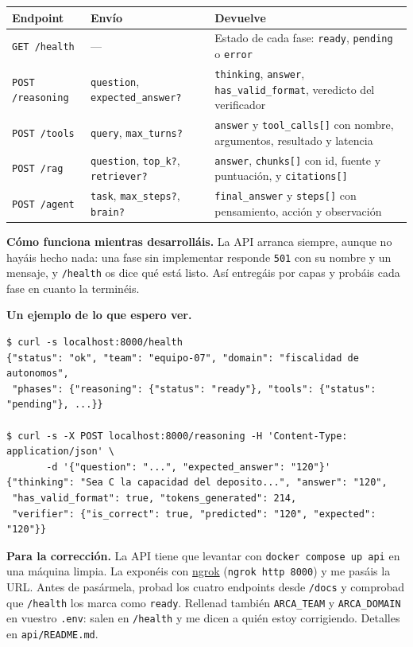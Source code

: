 \documentclass[11pt,a4paper]{article}
\newcommand{\code}[1]{{\small\texttt{#1}}}
\newcommand{\file}[1]{{\small\texttt{\textcolor{arcablue}{#1}}}}
\begin{document}
\begin{center}
\small
\begin{tabularx}{\textwidth}{@{}l l X@{}}
\toprule
\textbf{Endpoint} & \textbf{Envío} & \textbf{Devuelve} \\
\midrule
\code{GET /health} & --- & Estado de cada fase: \code{ready}, \code{pending} o \code{error} \\
\code{POST /reasoning} & \code{question}, \code{expected\_answer?} & \code{thinking},
  \code{answer}, \code{has\_valid\_format}, veredicto del verificador \\
\code{POST /tools} & \code{query}, \code{max\_turns?} & \code{answer} y \code{tool\_calls[]}
  con nombre, argumentos, resultado y latencia \\
\code{POST /rag} & \code{question}, \code{top\_k?}, \code{retriever?} & \code{answer},
  \code{chunks[]} con id, fuente y puntuación, y \code{citations[]} \\
\code{POST /agent} & \code{task}, \code{max\_steps?}, \code{brain?} &
  \code{final\_answer} y \code{steps[]} con pensamiento, acción y observación \\
\bottomrule
\end{tabularx}
\end{center}

\textbf{Cómo funciona mientras desarrolláis.} La API arranca siempre, aunque no hayáis hecho
nada: una fase sin implementar responde \code{501} con su nombre y un mensaje, y
\code{/health} os dice qué está listo. Así entregáis por capas y probáis cada fase en cuanto
la terminéis.

\textbf{Un ejemplo de lo que espero ver.}

{\footnotesize
\begin{verbatim}
$ curl -s localhost:8000/health
{"status": "ok", "team": "equipo-07", "domain": "fiscalidad de autonomos",
 "phases": {"reasoning": {"status": "ready"}, "tools": {"status": "pending"}, ...}}

$ curl -s -X POST localhost:8000/reasoning -H 'Content-Type: application/json' \
       -d '{"question": "...", "expected_answer": "120"}'
{"thinking": "Sea C la capacidad del deposito...", "answer": "120",
 "has_valid_format": true, "tokens_generated": 214,
 "verifier": {"is_correct": true, "predicted": "120", "expected": "120"}}
\end{verbatim}
}
\vspace{-1.6ex}

\begin{nota}
\textbf{Para la corrección.} La API tiene que levantar con \code{docker compose up api} en
una máquina limpia. La exponéis con \href{https://ngrok.com/}{ngrok} (\code{ngrok http 8000})
y me pasáis la URL. Antes de pasármela, probad los cuatro endpoints desde \code{/docs} y
comprobad que \code{/health} los marca como \code{ready}. Rellenad también \code{ARCA\_TEAM}
y \code{ARCA\_DOMAIN} en vuestro \code{.env}: salen en \code{/health} y me dicen a quién
estoy corrigiendo. Detalles en \file{api/README.md}.
\end{nota}
\end{document}
